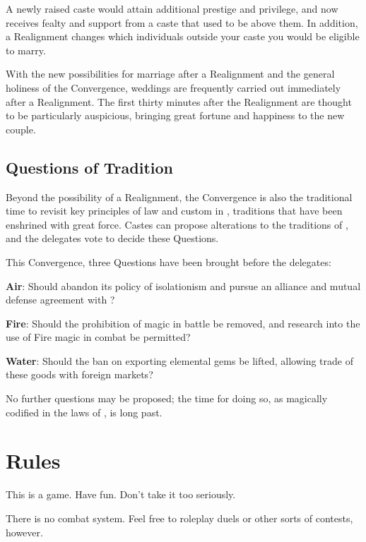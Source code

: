 \documentclass[sheet]{iron}
\begin{document}
A newly raised caste would attain additional prestige and privilege, and
now receives fealty and support from a caste that used to be above
them.  In addition, a Realignment changes which individuals outside
your caste you would be eligible to marry.

With the new possibilities for marriage after a Realignment and the general
holiness of the Convergence, weddings are frequently carried out immediately
after a Realignment.  The first thirty minutes after the Realignment
are thought to be particularly auspicious, bringing great fortune and
happiness to the new couple.

\subsection{Questions of Tradition}

Beyond the possibility of a Realignment, the Convergence is also the
traditional time to revisit key principles of law and custom in \sHomeCountry{},
traditions that have been enshrined with great force.  Castes can propose
alterations to the traditions of \sHomeCountry{}, and the delegates vote
to decide these Questions.

This Convergence, three Questions have been brought before the delegates:

\begin{itemz}
\item \textbf{Air}:
  Should \sHomeCountry{} abandon its policy of isolationism and pursue
  an alliance and mutual defense agreement with \sTreatyCountry{}?
\item \textbf{Fire}: Should the prohibition of
  magic in battle be removed, and research into the use
  of Fire magic in combat be permitted?
\item \textbf{Water}: Should the ban on exporting elemental gems be
  lifted, allowing trade of these goods with foreign markets?
\end{itemz}

No further questions may be proposed; the time for doing so,
as magically codified in the
laws of \sHomeCountry{}, is long past.

\section{Rules}

This is a game.  Have fun.  Don't take it too seriously.

There is no combat system.  Feel free to roleplay duels or other sorts
of contests, however.
\end{document}
